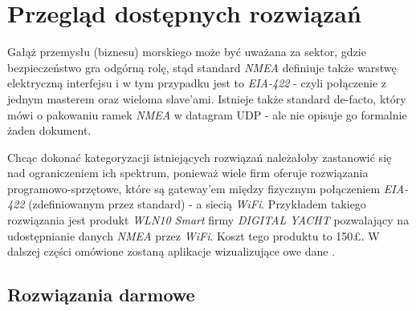 \documentclass[skorowidz,skroty]{dyplomWEZUT}
\begin{document}
\chapter{Przegląd dostępnych rozwiązań}\label{chap: Available solutions}

Gałąż przemysłu (biznesu) morskiego może być uważana za sektor, gdzie bezpieczeństwo gra odgórną rolę, stąd standard \textit{NMEA} definiuje także warstwę elektryczną interfejsu i w tym przypadku jest to \textit{EIA-422} - czyli połączenie z jednym masterem oraz wieloma slave'ami. Istnieje także standard de-facto, który mówi o pakowaniu ramek \textit{NMEA} w datagram UDP - ale nie opisuje go formalnie żaden dokument.

Chcąc dokonać kategoryzacji istniejących rozwiązań należałoby zastanowić się nad ograniczeniem ich spektrum, ponieważ wiele firm oferuje rozwiązania programowo-sprzętowe, które są gateway'em między fizycznym połączeniem \textit{EIA-422} (zdefiniowanym przez standard) - a siecią \textit{WiFi}. Przykładem takiego rozwiązania jest produkt \textit{WLN10 Smart} firmy \textit{DIGITAL YACHT} \cite{DIGITALYACHT} pozwalający na udostępnianie danych \textit{NMEA} przez \textit{WiFi}. Koszt tego produktu to 150£. W dalszej części omówione zostaną aplikacje wizualizujące owe dane .

\section{Rozwiązania darmowe}\label{chap: Free solutions}
\end{document}
